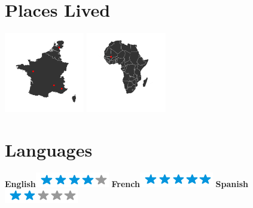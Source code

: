 \documentclass[]{friggeri-cv}
\begin{document}
\begin{aside}
~
~
~
  \section{Places Lived}
    \includegraphics[width=3.5cm]{img/map.png}
    \includegraphics[width=3.5cm]{img/mapAfrica.png}
    ~
  \section{Languages}
    \textbf{English}\includegraphics[scale=0.40]{img/4stars.png}
    \textbf{French}\includegraphics[scale=0.40]{img/5stars.png}
    \textbf{Spanish}\includegraphics[scale=0.40]{img/2stars.png}
\end{aside}

\end{document}
